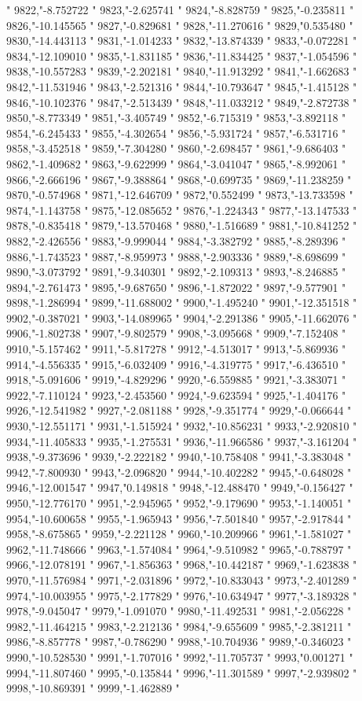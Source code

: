 "
9822,"-8.752722
"
9823,"-2.625741
"
9824,"-8.828759
"
9825,"-0.235811
"
9826,"-10.145565
"
9827,"-0.829681
"
9828,"-11.270616
"
9829,"0.535480
"
9830,"-14.443113
"
9831,"-1.014233
"
9832,"-13.874339
"
9833,"-0.072281
"
9834,"-12.109010
"
9835,"-1.831185
"
9836,"-11.834425
"
9837,"-1.054596
"
9838,"-10.557283
"
9839,"-2.202181
"
9840,"-11.913292
"
9841,"-1.662683
"
9842,"-11.531946
"
9843,"-2.521316
"
9844,"-10.793647
"
9845,"-1.415128
"
9846,"-10.102376
"
9847,"-2.513439
"
9848,"-11.033212
"
9849,"-2.872738
"
9850,"-8.773349
"
9851,"-3.405749
"
9852,"-6.715319
"
9853,"-3.892118
"
9854,"-6.245433
"
9855,"-4.302654
"
9856,"-5.931724
"
9857,"-6.531716
"
9858,"-3.452518
"
9859,"-7.304280
"
9860,"-2.698457
"
9861,"-9.686403
"
9862,"-1.409682
"
9863,"-9.622999
"
9864,"-3.041047
"
9865,"-8.992061
"
9866,"-2.666196
"
9867,"-9.388864
"
9868,"-0.699735
"
9869,"-11.238259
"
9870,"-0.574968
"
9871,"-12.646709
"
9872,"0.552499
"
9873,"-13.733598
"
9874,"-1.143758
"
9875,"-12.085652
"
9876,"-1.224343
"
9877,"-13.147533
"
9878,"-0.835418
"
9879,"-13.570468
"
9880,"-1.516689
"
9881,"-10.841252
"
9882,"-2.426556
"
9883,"-9.999044
"
9884,"-3.382792
"
9885,"-8.289396
"
9886,"-1.743523
"
9887,"-8.959973
"
9888,"-2.903336
"
9889,"-8.698699
"
9890,"-3.073792
"
9891,"-9.340301
"
9892,"-2.109313
"
9893,"-8.246885
"
9894,"-2.761473
"
9895,"-9.687650
"
9896,"-1.872022
"
9897,"-9.577901
"
9898,"-1.286994
"
9899,"-11.688002
"
9900,"-1.495240
"
9901,"-12.351518
"
9902,"-0.387021
"
9903,"-14.089965
"
9904,"-2.291386
"
9905,"-11.662076
"
9906,"-1.802738
"
9907,"-9.802579
"
9908,"-3.095668
"
9909,"-7.152408
"
9910,"-5.157462
"
9911,"-5.817278
"
9912,"-4.513017
"
9913,"-5.869936
"
9914,"-4.556335
"
9915,"-6.032409
"
9916,"-4.319775
"
9917,"-6.436510
"
9918,"-5.091606
"
9919,"-4.829296
"
9920,"-6.559885
"
9921,"-3.383071
"
9922,"-7.110124
"
9923,"-2.453560
"
9924,"-9.623594
"
9925,"-1.404176
"
9926,"-12.541982
"
9927,"-2.081188
"
9928,"-9.351774
"
9929,"-0.066644
"
9930,"-12.551171
"
9931,"-1.515924
"
9932,"-10.856231
"
9933,"-2.920810
"
9934,"-11.405833
"
9935,"-1.275531
"
9936,"-11.966586
"
9937,"-3.161204
"
9938,"-9.373696
"
9939,"-2.222182
"
9940,"-10.758408
"
9941,"-3.383048
"
9942,"-7.800930
"
9943,"-2.096820
"
9944,"-10.402282
"
9945,"-0.648028
"
9946,"-12.001547
"
9947,"0.149818
"
9948,"-12.488470
"
9949,"-0.156427
"
9950,"-12.776170
"
9951,"-2.945965
"
9952,"-9.179690
"
9953,"-1.140051
"
9954,"-10.600658
"
9955,"-1.965943
"
9956,"-7.501840
"
9957,"-2.917844
"
9958,"-8.675865
"
9959,"-2.221128
"
9960,"-10.209966
"
9961,"-1.581027
"
9962,"-11.748666
"
9963,"-1.574084
"
9964,"-9.510982
"
9965,"-0.788797
"
9966,"-12.078191
"
9967,"-1.856363
"
9968,"-10.442187
"
9969,"-1.623838
"
9970,"-11.576984
"
9971,"-2.031896
"
9972,"-10.833043
"
9973,"-2.401289
"
9974,"-10.003955
"
9975,"-2.177829
"
9976,"-10.634947
"
9977,"-3.189328
"
9978,"-9.045047
"
9979,"-1.091070
"
9980,"-11.492531
"
9981,"-2.056228
"
9982,"-11.464215
"
9983,"-2.212136
"
9984,"-9.655609
"
9985,"-2.381211
"
9986,"-8.857778
"
9987,"-0.786290
"
9988,"-10.704936
"
9989,"-0.346023
"
9990,"-10.528530
"
9991,"-1.707016
"
9992,"-11.705737
"
9993,"0.001271
"
9994,"-11.807460
"
9995,"-0.135844
"
9996,"-11.301589
"
9997,"-2.939802
"
9998,"-10.869391
"
9999,"-1.462889
"
